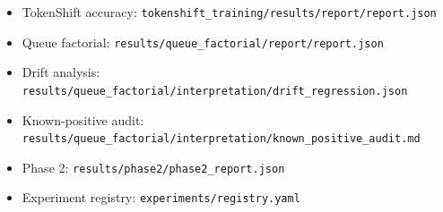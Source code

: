 \begin{itemize}
\item TokenShift accuracy: \texttt{tokenshift\_\linebreak[1]training/\linebreak[1]results/\linebreak[1]report/\linebreak[1]report.\linebreak[1]json}
\item Queue factorial: \texttt{results/\linebreak[1]queue\_\linebreak[1]factorial/\linebreak[1]report/\linebreak[1]report.\linebreak[1]json}
\item Drift analysis: \texttt{results/\linebreak[1]queue\_\linebreak[1]factorial/\linebreak[1]interpretation/\linebreak[1]drift\_\linebreak[1]regression.\linebreak[1]json}
\item Known-positive audit: \texttt{results/\linebreak[1]queue\_\linebreak[1]factorial/\linebreak[1]interpretation/\linebreak[1]known\_\linebreak[1]positive\_\linebreak[1]audit.\linebreak[1]md}
\item Phase 2: \texttt{results/\linebreak[1]phase2/\linebreak[1]phase2\_\linebreak[1]report.\linebreak[1]json}
\item Experiment registry: \texttt{experiments/\linebreak[1]registry.\linebreak[1]yaml}
\end{itemize}
